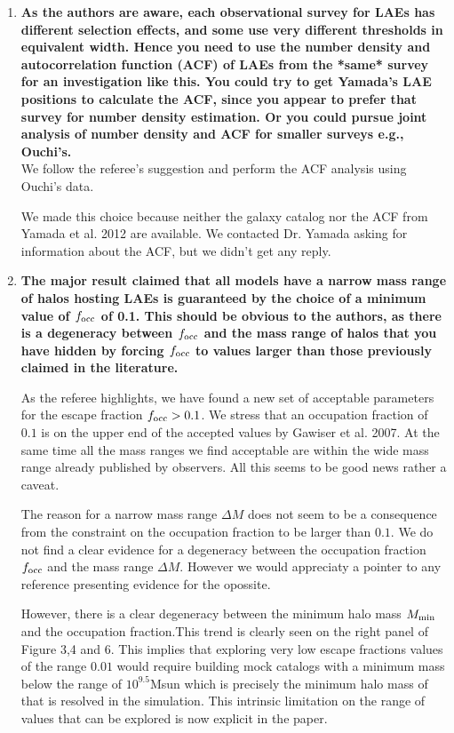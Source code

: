\documentclass[12pts]{article}
\begin{document}
\begin{enumerate}
\item {\bf As the authors are aware, each observational survey for LAEs has
  different selection effects, and some use very different thresholds
  in equivalent width.  Hence you need to use the number density and
  autocorrelation function (ACF) of LAEs from the *same* survey for an
  investigation like this.  You could try to get Yamada's LAE
  positions to calculate the ACF, since you appear to prefer that
  survey for number density estimation.  Or you could pursue joint
  analysis of number density and ACF for smaller surveys e.g.,
  Ouchi's. }\\


  We follow the referee's suggestion and perform the ACF analysis
  using Ouchi's data.

  We made this choice because neither the galaxy catalog
  nor the ACF from Yamada et al. 2012 are available. We contacted
  Dr. Yamada asking for information about the ACF, but we didn't get
  any reply.  

\item {\bf 
  The major result claimed that all models have a narrow mass range
  of halos hosting LAEs is guaranteed by the choice of a minimum
  value of $f_{\rm occ}$ of 0.1.  This should be obvious to the authors, as
  there is a degeneracy between $f_{\rm occ}$ and the mass range of halos
  that you have hidden by forcing $f_{\rm occ}$ to values larger than those
  previously claimed in the literature. }

  As the referee highlights, we have found a new set of acceptable
  parameters for the escape fraction $f_{\rm occ}>0.1$. We stress that
  an occupation fraction of $0.1$ is on the upper end of the accepted
  values by Gawiser et al. 2007. At the same time all the mass ranges
  we find acceptable are within the wide mass range already published
  by observers. All this seems to be good news rather a caveat.

  The reason for a narrow mass range $\Delta M$ does not
  seem to be a consequence from the constraint on the occupation
  fraction to be larger than $0.1$. We do not find a clear evidence
  for a degeneracy between the occupation fraction $f_{\rm occ}$ and
  the mass range $\Delta M$. However we would appreciaty a pointer to
  any reference presenting evidence for the opossite.

  However, there is a clear degeneracy between the minimum halo mass
  $M_{\rm min}$ and the occupation fraction.This trend is clearly
  seen on the right panel of Figure 3,4 and 6. This implies that
  exploring very low escape fractions values of the range $0.01$ would
  require building mock catalogs with a minimum mass below the range of
  $10^{9.5}$Msun which is precisely the minimum halo mass of
  that is resolved in the simulation. This intrinsic limitation on the
  range of values that can be explored is now explicit in the paper. 


\end{enumerate}
\end{document}
